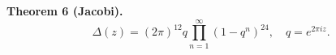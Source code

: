 \textbf{Theorem 6 (Jacobi).}
$$\Delta(z) = (2\pi)^{12} q \prod_{n=1}^{\infty} (1-q^n)^{24}, \quad q = e^{2\pi i z}.$$

